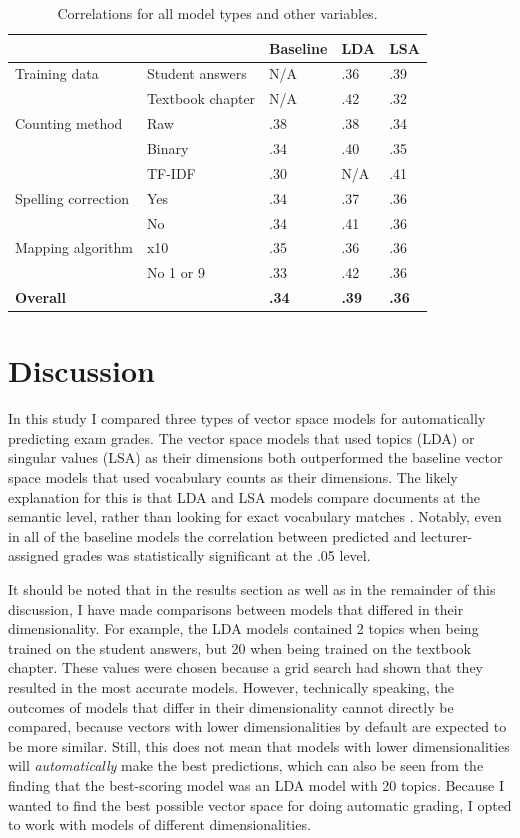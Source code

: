 \documentclass[a4paper,10pt,twoside]{article}
\begin{document}
\begin{table}[h]
	\caption{Correlations for all model types and other variables.}
	\label{table1}
	\centering
	\begin{tabular}{lllll}
		\hline  &  & \textbf{Baseline} & \textbf{LDA} & \textbf{LSA} \\ 
		\hline  Training data & Student answers & N/A & .36 & .39 \\ 
		& Textbook chapter & N/A & .42 & .32 \\ 
		\hline  Counting method & Raw & .38 & .38 & .34 \\ 
		& Binary & .34 & .40 & .35 \\ 
		& TF-IDF & .30 & N/A & .41 \\ 
		\hline  Spelling correction & Yes & .34 & .37 & .36 \\ 
		& No & .34 & .41 & .36 \\ 
		\hline  Mapping algorithm & x10 & .35 & .36 & .36 \\ 
		& No 1 or 9 & .33 & .42 & .36 \\ 
		\hline  \textbf{Overall} &  & \textbf{.34} & \textbf{.39} & \textbf{.36} \\ 
		\hline 
	\end{tabular} 
\end{table}

\newpage
\section{Discussion}
In this study I compared three types of vector space models for automatically predicting exam grades. The vector space models that used topics (LDA) or singular values (LSA) as their dimensions both outperformed the baseline vector space models that used vocabulary counts as their dimensions. The likely explanation for this is that LDA and LSA models compare documents at the semantic level, rather than looking for exact vocabulary matches \cite{kakkonen2008}. Notably, even in all of the baseline models the correlation between predicted and lecturer-assigned grades was statistically significant at the .05 level.

It should be noted that in the results section as well as in the remainder of this discussion, I have made comparisons between models that differed in their dimensionality. For example, the LDA models contained 2 topics when being trained on the student answers, but 20 when being trained on the textbook chapter. These values were chosen because a grid search had shown that they resulted in the most accurate models. However, technically speaking, the outcomes of models that differ in their dimensionality cannot directly be compared, because vectors with lower dimensionalities by default are expected to be more similar. Still, this does not mean that models with lower dimensionalities will \textit{automatically} make the best predictions, which can also be seen from the finding that the best-scoring model was an LDA model with 20 topics. Because I wanted to find the best possible vector space for doing automatic grading, I opted to work with models of different dimensionalities.
\end{document}
